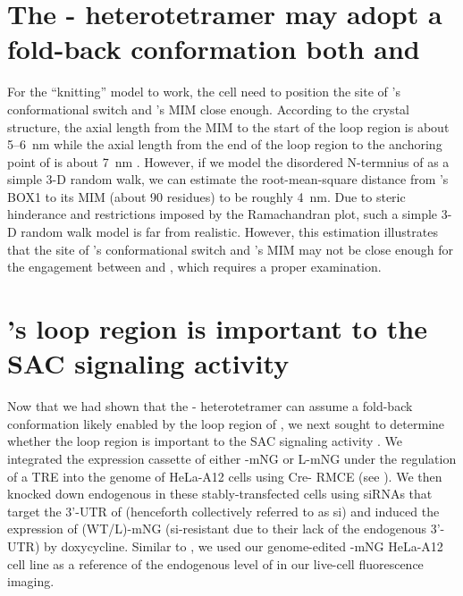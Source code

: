 \section{The - heterotetramer may adopt a fold-back conformation both  and }

For the ``knitting'' model to work, the cell need to position the site of 's conformational switch and 's MIM close enough. According to the crystal structure, the axial length from the MIM to the start of the loop region is about 5--\SI{6}{nm} while the axial length from the end of the loop region to the anchoring point of  is about \SI{7}{nm} \cite{TemplateModel, Ji2017eLife, BUB1-CDC20-MAD1, Structure1GO4, Structure4DZO}. However, if we model the disordered N-termnius of  as a simple 3-D random walk, we can estimate the root-mean-square distance from 's BOX1 to its MIM (about 90 residues) to be roughly \SI{4}{nm}. Due to steric hinderance and restrictions imposed by the Ramachandran plot, such a simple 3-D random walk model is far from realistic. However, this estimation illustrates that the site of 's conformational switch and 's MIM may not be close enough for the engagement between  and , which requires a proper examination.


\section{'s loop region is important to the SAC signaling activity }
\label{LoopDeletionSection}

Now that we had shown that the - heterotetramer can assume a fold-back conformation likely enabled by the loop region of , we next sought to determine whether the loop region is important to the SAC signaling activity . We integrated the expression cassette of either -mNG or \textDelta{}L-mNG under the regulation of a TRE into the genome of HeLa-A12 cells using Cre- RMCE (see ). We then knocked down endogenous  in these stably-transfected cells using siRNAs that target the 3'-UTR of  \cite{siMAD1-3UTR} (henceforth collectively referred to as si) and induced the expression of (WT/\textDelta{}L)-mNG (si-resistant due to their lack of the endogenous 3'-UTR) by doxycycline. Similar to , we used our genome-edited -mNG HeLa-A12 cell line as a reference of the endogenous level of  in our live-cell fluorescence imaging.

